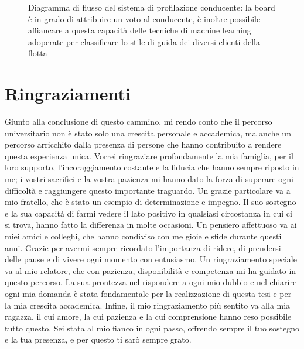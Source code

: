 \documentclass[12pt, a4paper, italian]{report}
\numberwithin{figure}{chapter}
\numberwithin{table}{chapter}
\begin{document}
\vspace{0.5cm}
\begin{figure}[h]
\centering
{}
\caption{Diagramma di flusso del sistema di profilazione conducente: la board è in grado di attribuire un voto al conducente, è inoltre possibile affiancare a questa capacità delle tecniche di machine learning adoperate per classificare lo stile di guida dei diversi clienti della flotta}
\label{fig:ProfilazioneML}
\end{figure}

\chapter*{Ringraziamenti}
Giunto alla conclusione di questo cammino, mi rendo conto che il percorso universitario non è stato solo una crescita personale e accademica, ma anche un percorso arricchito dalla presenza di persone che hanno contribuito a rendere questa esperienza unica.
Vorrei ringraziare profondamente la mia famiglia, per il loro supporto, l'incoraggiamento costante e la fiducia che hanno sempre riposto in me; i vostri sacrifici e la vostra pazienza mi hanno dato la forza di superare ogni difficoltà e raggiungere questo importante traguardo.
Un grazie particolare va a mio fratello, che è stato un esempio di determinazione e impegno. Il suo sostegno e la sua capacità di farmi vedere il lato positivo in qualsiasi circostanza in cui ci si trova, hanno fatto la differenza in molte occasioni.
Un pensiero affettuoso va ai miei amici e colleghi, che hanno condiviso con me gioie e sfide durante questi anni. Grazie per avermi sempre ricordato l'importanza di ridere, di prendersi delle pause e di vivere ogni momento con entusiasmo.
Un ringraziamento speciale va al mio relatore, che con pazienza, disponibilità e competenza mi ha guidato in questo percorso. La sua prontezza nel rispondere a ogni mio dubbio e nel chiarire ogni mia domanda è stata fondamentale per la realizzazione di questa tesi e per la mia crescita accademica.
Infine, il mio ringraziamento più sentito va alla mia ragazza, il cui amore, la cui pazienza e la cui comprensione hanno reso possibile tutto questo. Sei stata al mio fianco in ogni passo, offrendo sempre il tuo sostegno e la tua presenza, e per questo ti sarò sempre grato.

\printbibliography[title={Bibliografia}]
\end{document}
